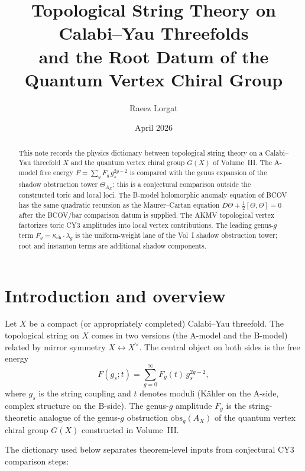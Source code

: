 \documentclass[11pt]{amsart}
\title{Topological String Theory on Calabi--Yau Threefolds\\
 and the Root Datum of the Quantum Vertex Chiral Group}
\author{Raeez Lorgat}
\date{April 2026}
\theoremstyle{plain}
\theoremstyle{definition}
\theoremstyle{remark}
\begin{document}
\maketitle

\begin{abstract}
This note records the physics dictionary between topological string theory on
a Calabi--Yau threefold $X$ and the quantum vertex chiral group $G(X)$ of
Volume~III. The A-model free energy
$F = \sum_g F_g\, g_s^{2g-2}$ is compared with the genus expansion of the
shadow obstruction tower $\Theta_{A_X}$; this is a conjectural comparison
outside the constructed toric and local loci. The B-model holomorphic anomaly
equation of BCOV has the same quadratic recursion as the Maurer--Cartan
equation $D\Theta + \frac{1}{2}[\Theta, \Theta] = 0$ after the BCOV/bar
comparison datum is supplied. The AKMV topological vertex factorizes toric
CY3 amplitudes into local vertex contributions. The leading genus-$g$ term
$F_g = \kappa_{\mathrm{ch}} \cdot \lambda_g$ is the uniform-weight lane of the
Vol~I shadow obstruction tower; root and instanton terms are additional
shadow components.
\end{abstract}

\tableofcontents

\section{Introduction and overview}
\label{sec:intro}

Let $X$ be a compact (or appropriately completed) Calabi--Yau threefold.
The topological string on $X$ comes in two versions (the A-model and the
B-model) related by mirror symmetry $X \leftrightarrow X^\vee$. The
central object on both sides is the free energy
\begin{equation}\label{eq:free-energy}
 F(g_s; t) = \sum_{g=0}^{\infty} F_g(t)\, g_s^{2g-2},
\end{equation}
where $g_s$ is the string coupling and $t$ denotes moduli (K\"ahler on the
A-side, complex structure on the B-side). The genus-$g$ amplitude $F_g$ is
the string-theoretic analogue of the genus-$g$ obstruction
$\mathrm{obs}_g(A_X)$ of the quantum vertex chiral group $G(X)$ constructed
in Volume~III.

The dictionary used below separates theorem-level inputs from conjectural
CY3 comparison steps:
\end{document}
